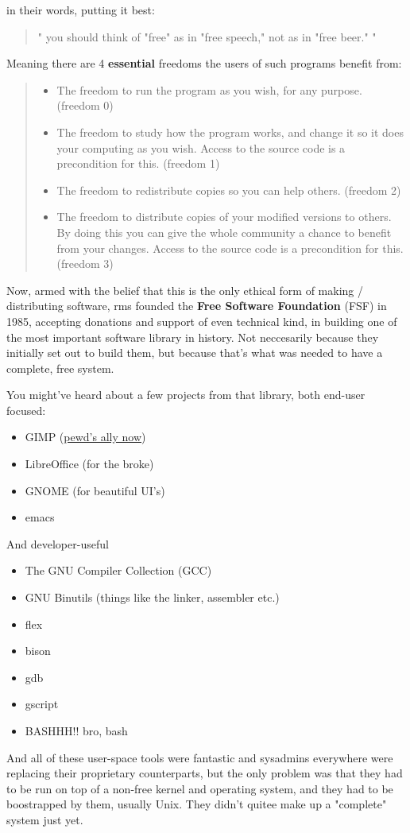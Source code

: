 \documentclass[sigplan,screen]{acmart}
\begin{document}
in their words, putting it best:
\begin{quote}
	"
	you should think of "free" as in "free speech," not as in "free beer."
	"
\end{quote}

Meaning there are 4 \textbf{essential} freedoms the users of such programs benefit from:

\begin{quotation}
	\begin{itemize}
		\item 	The freedom to run the program as you wish, for any purpose. (freedom 0)
		\item 	The freedom to study how the program works, and change it so it does your computing as you wish. Access to the source code is a precondition for this. (freedom 1)
		\item  	The freedom to redistribute copies so you can help others. (freedom 2)
		\item  	The freedom to distribute copies of your modified versions to others. By doing this you can give the whole community a chance to benefit from your changes. Access to the source code is a precondition for this. (freedom 3)
	\end{itemize}
\end{quotation}

Now, armed with the belief that this is the only ethical form of making / distributing software, rms founded the \textbf{Free Software Foundation} (FSF) in 1985, accepting donations and support of even technical kind, in building one of the most important software library in history. Not neccesarily because they initially set out to build them, but because that's what was needed to have a complete, free system. \cite{gnu-and-linux}

You might've heard about a few projects from that library, both end-user focused:
\begin{itemize}
	\item GIMP (\href{https://www.youtube.com/watch?v=pVI_smLgTY0}{pewd's ally now}) \cite{pewds-linux}
	\item LibreOffice (for the broke)
	\item GNOME (for beautiful UI's)\cite{gnome}
	\item emacs
\end{itemize}
And developer-useful
\begin{itemize}
	\item The GNU Compiler Collection (GCC)
	\item GNU Binutils (things like the linker, assembler etc.)
	\item flex
	\item bison
	\item gdb
	\item gscript
	\item BASHHH!! bro, bash
\end{itemize}
And all of these user-space tools were fantastic and sysadmins everywhere were replacing their proprietary counterparts, but the only problem was that they had to be run on top of a non-free kernel and operating system, and they had to be boostrapped by them, usually Unix. They didn't quitee make up a "complete" system just yet.
\end{document}
